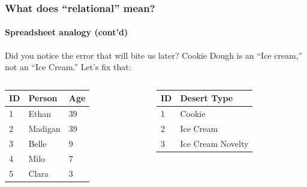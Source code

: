 \documentclass[aspectratio=169]{beamer}
\begin{document}
\begin{frame}
  \frametitle{What does ``relational'' mean?}
  \framesubtitle{Spreadsheet analogy (cont'd)}

  Did you notice the error that will bite us later? Cookie Dough is an ``Ice cream,'' not an ``Ice
  Cream.'' Let's fix that:

  \begin{columns}[T]
    \begin{column}{0.3\textwidth}
      \begin{table}[]
        \tiny
        \begin{tabular}{@{}lll@{}}
          \toprule
          ID & Person  & Age \\ \midrule
          1  & Ethan   & 39  \\
          2  & Madigan & 39  \\
          3  & Belle   & 9   \\
          4  & Milo    & 7   \\
          5  & Clara   & 3   \\ \bottomrule
        \end{tabular}
      \end{table}
    \end{column}
    \begin{column}{0.5\textwidth}
      \begin{table}[]
        \tiny
        \begin{tabular}{@{}ll@{}}
          \toprule
          ID & Desert Type       \\ \midrule
          1  & Cookie            \\
          2  & Ice Cream         \\
          3  & Ice Cream Novelty \\ \bottomrule
        \end{tabular}
      \end{table}
    \end{column}
  \end{columns}


\end{frame}
\end{document}
